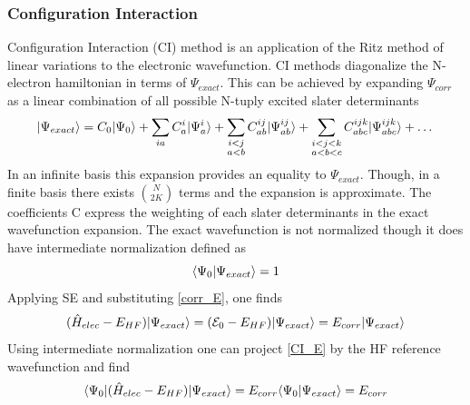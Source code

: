    \subsubsection{Configuration Interaction}
      Configuration Interaction (CI) method is an application of the Ritz method of linear variations to the electronic wavefunction\cite{Shavitt 1977, Ritz 1909, Szabo 1998}. CI methods diagonalize the N-electron hamiltonian in terms of $\Psi_{exact}$.  This can be achieved by expanding $\Psi_{corr}$ as a linear combination of all possible N-tuply excited slater determinants%
        \begin{equation}\label{CI_wfn}
      	  | \Psi_{exact} \rangle = C_0| \Psi_0 \rangle + \sum_{ia} C^i_a | \Psi^i_a \rangle + \sum_{\substack{i<j\\  a<b}} C^{ij}_{ab} | \Psi^{ij}_{ab} \rangle + \sum_{\substack{i<j<k \\ a<b<c}} C_{abc}^{ijk} | \Psi_{abc}^{ijk} \rangle + \dots 
        \end{equation}
      In an infinite basis this expansion provides an equality to $\Psi_{exact}$.  Though, in a finite basis there exists $\binom{N}{2K}$\cite{Szabo 1998} terms and the expansion is approximate. The coefficients C express the weighting of each slater determinants in the exact wavefunction expansion.  The exact wavefunction is not normalized though it does have intermediate normalization\cite{Szabo 1998} defined as 
        \begin{equation}
        \langle\Psi_0|\Psi_{exact}\rangle = 1
        \end{equation}
      Applying SE and substituting \cref{corr_E}, one finds
        \begin{equation} \label{CI_E}
        	(\hat{H}_{elec} - E_{HF})| \Psi_{exact} \rangle = (\mathcal{E}_0 - E_{HF})| \Psi_{exact} \rangle = E_{corr} | \Psi_{exact} \rangle
        \end{equation}
      Using intermediate normalization one can project \cref{CI_E} by the HF reference wavefunction and find 
        \begin{equation}
      	  \langle\Psi_0 |(\hat{H}_{elec} - E_{HF})| \Psi_{exact} \rangle = E_{corr}\langle\Psi_0|\Psi_{exact}\rangle = E_{corr}
        \end{equation}

